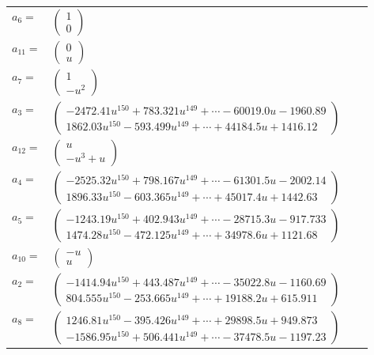 \documentclass[1p]{elsarticle_modified}
\theoremstyle{definition}
\begin{document}
\begin{tabular}{m{7pt} m{180pt} m{7pt} m{180pt} }
\flushright $a_{6}=$&$\begin{pmatrix}1\\0\end{pmatrix}$ \\
\flushright $a_{11}=$&$\begin{pmatrix}0\\u\end{pmatrix}$ \\
\flushright $a_{7}=$&$\begin{pmatrix}1\\- u^2\end{pmatrix}$ \\
\flushright $a_{3}=$&$\begin{pmatrix}-2472.41 u^{150}+783.321 u^{149}+\cdots-60019.0 u-1960.89\\1862.03 u^{150}-593.499 u^{149}+\cdots+44184.5 u+1416.12\end{pmatrix}$ \\
\flushright $a_{12}=$&$\begin{pmatrix}u\\- u^3+u\end{pmatrix}$ \\
\flushright $a_{4}=$&$\begin{pmatrix}-2525.32 u^{150}+798.167 u^{149}+\cdots-61301.5 u-2002.14\\1896.33 u^{150}-603.365 u^{149}+\cdots+45017.4 u+1442.63\end{pmatrix}$ \\
\flushright $a_{5}=$&$\begin{pmatrix}-1243.19 u^{150}+402.943 u^{149}+\cdots-28715.3 u-917.733\\1474.28 u^{150}-472.125 u^{149}+\cdots+34978.6 u+1121.68\end{pmatrix}$ \\
\flushright $a_{10}=$&$\begin{pmatrix}- u\\u\end{pmatrix}$ \\
\flushright $a_{2}=$&$\begin{pmatrix}-1414.94 u^{150}+443.487 u^{149}+\cdots-35022.8 u-1160.69\\804.555 u^{150}-253.665 u^{149}+\cdots+19188.2 u+615.911\end{pmatrix}$ \\
\flushright $a_{8}=$&$\begin{pmatrix}1246.81 u^{150}-395.426 u^{149}+\cdots+29898.5 u+949.873\\-1586.95 u^{150}+506.441 u^{149}+\cdots-37478.5 u-1197.23\end{pmatrix}$ \\

\end{tabular}
\end{document}
